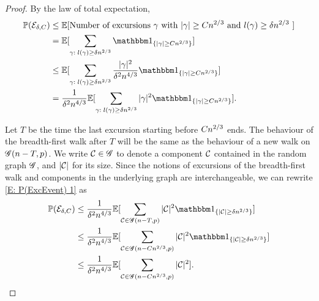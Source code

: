 \begin{proof}
	By the law of total expectation,
	\begin{equation} \label{E: P(ExcEvent) 1}
	\begin{aligned}
	\Prob(\ExcursionEvent) 
	&\leq \Exp{ \text{Number of excursions $\gamma$ with $|\gamma| \geq C\n{2}{3}$ and $l(\gamma) \geq \delta\n{2}{3}$ } } \\
	&= \Exp{ \sum_{\gamma: \; l(\gamma) \geq \delta\n{2}{3}} \Ind{\{|\gamma| \geq C\n{2}{3} \} } } \\
	&\leq \Exp{ \sum_{\gamma: \; l(\gamma) \geq \delta\n{2}{3}} \frac{|\gamma|^2}{\delta^2\n{4}{3}} \Ind{\{|\gamma| \geq C\n{2}{3} \} }} \\
	&= \frac{1}{\delta^2\n{4}{3}} \Exp{ \sum_{\gamma: \; l(\gamma) \geq \delta\n{2}{3}}  |\gamma|^2 \Ind{\{|\gamma| \geq C\n{2}{3} \} }}.
	\end{aligned}
	\end{equation}
	
	Let $T$ be the time the last excursion starting before $Cn^{2 / 3}$ ends.
	The behaviour of the breadth-first walk after $T$ will be the same as the behaviour of a new walk on $\mathscr{G}(n-T,p)$.
	We write $\mathcal{C} \in \mathscr{G}$ to denote a component $\mathcal{C}$ contained in the random graph $\mathscr{G}$,
	and $|\mathcal{C}|$ for its size.
	Since the notions of excursions of the breadth-first walk and components in the underlying graph are interchangeable,
	we can rewrite \eqref{E: P(ExcEvent) 1} as
	\begin{equation} \label{E: P(ExcEvent) 2}
	\begin{aligned}
	\Prob(\ExcursionEvent) 
	&\leq \frac{1}{\delta^2\n{4}{3}} \Exp{ \sum_{\Ccal \in \Gcal(n-T, p)}  |\Ccal|^2 \Ind{\{|\Ccal| \geq \delta\n{2}{3} \} }} \\
	&\leq \frac{1}{\delta^2\n{4}{3}} \Exp{ \sum_{\Ccal \in \Gcal(n-C\n{2}{3}, p)}  |\Ccal|^2 \Ind{\{|\Ccal| \geq \delta\n{2}{3} \} }} \\
	&\leq \frac{1}{\delta^2\n{4}{3}} \Exp{ \sum_{\Ccal \in \Gcal(n-C\n{2}{3}, p)}  |\Ccal|^2 }.
	\end{aligned}
	\end{equation}
	

\end{proof}
